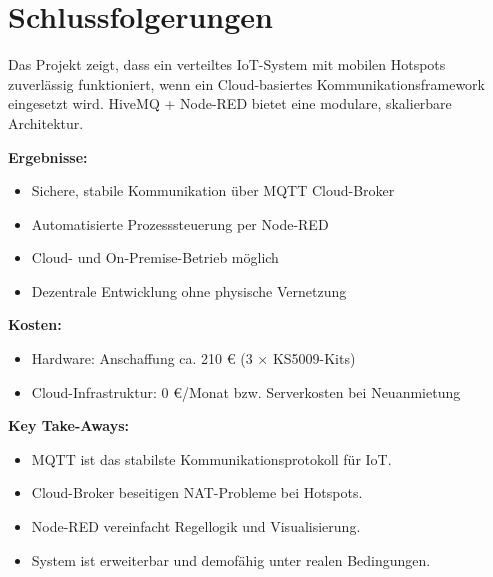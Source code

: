 \section{Schlussfolgerungen}
Das Projekt zeigt, dass ein verteiltes IoT-System mit mobilen Hotspots zuverlässig funktioniert, wenn ein Cloud-basiertes Kommunikationsframework eingesetzt wird.  
HiveMQ + Node-RED bietet eine modulare, skalierbare Architektur.

\textbf{Ergebnisse:}
\begin{itemize}[noitemsep]
	\item Sichere, stabile Kommunikation über MQTT Cloud-Broker
	\item Automatisierte Prozesssteuerung per Node-RED
	\item Cloud- und On-Premise-Betrieb möglich
	\item Dezentrale Entwicklung ohne physische Vernetzung
\end{itemize}

\textbf{Kosten:}
\begin{itemize}[noitemsep]
	\item Hardware: Anschaffung ca. 210 € (3 × KS5009-Kits)
	\item Cloud-Infrastruktur: 0 €/Monat bzw. Serverkosten bei Neuanmietung
\end{itemize}

\textbf{Key Take-Aways:}
\begin{itemize}[noitemsep]
	\item MQTT ist das stabilste Kommunikationsprotokoll für IoT.
	\item Cloud-Broker beseitigen NAT-Probleme bei Hotspots.
	\item Node-RED vereinfacht Regellogik und Visualisierung.
	\item System ist erweiterbar und demofähig unter realen Bedingungen.
\end{itemize}
